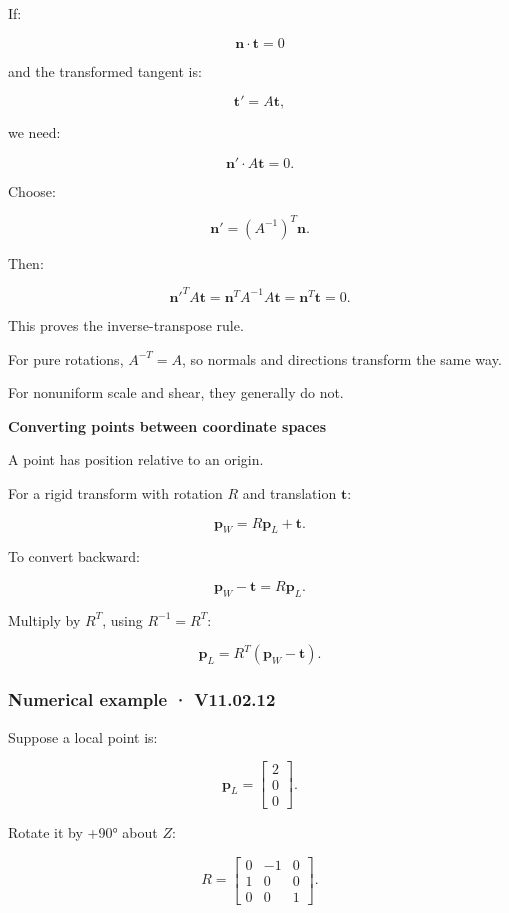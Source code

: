 If:

\[
 \mathbf n\cdot\mathbf t=0
\]

and the transformed tangent is:

\[
 \mathbf t'=A\mathbf t,
\]

we need:

\[
 \mathbf n'\cdot A\mathbf t=0.
\]

Choose:

\[
 \mathbf n'=(A^{-1})^T\mathbf n.
\]

Then:

\[
 \mathbf n'^TA\mathbf t = \mathbf n^TA^{-1}A\mathbf t = \mathbf n^T\mathbf t=0.
\]

This proves the inverse-transpose rule.

For pure rotations, \(A^{-T}=A\), so normals and directions transform the same way.

For nonuniform scale and shear, they generally do not.

\textbf{Converting points between coordinate spaces}

A point has position relative to an origin.

For a rigid transform with rotation \(R\) and translation \(\mathbf t\):

\[
 \boxed{ \mathbf p_W=R\mathbf p_L+\mathbf t }.
\]

To convert backward:

\[
 \mathbf p_W-\mathbf t=R\mathbf p_L.
\]

Multiply by \(R^T\), using \(R^{-1}=R^T\):

\[
 \boxed{ \mathbf p_L=R^T(\mathbf p_W-\mathbf t) }.
\]

\subsubsection{Numerical example · V11.02.12}\label{02-foundations-ii-ch032-numerical-example-v11.02.12}

Suppose a local point is:

\[
 \mathbf p_L= \begin{bmatrix}2\\0\\0\end{bmatrix}.
\]

Rotate it by +90° about \(Z\):

\[
 R= \begin{bmatrix} 0&-1&0\\ 1&0&0\\ 0&0&1 \end{bmatrix}.
\]

